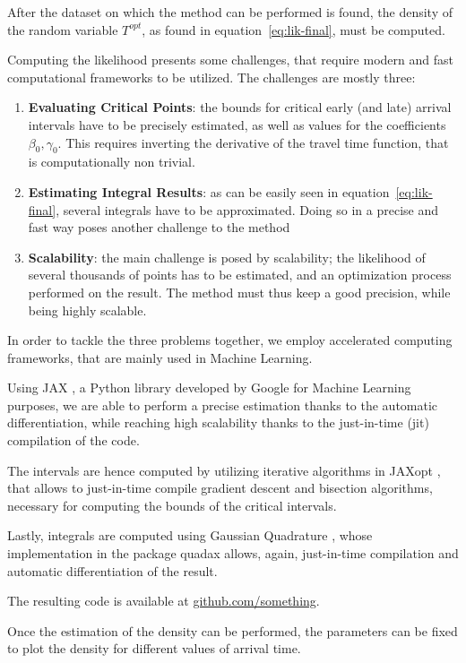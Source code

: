 After the dataset on which the method can be performed is found,
the density of the random variable \(T^{opt}\),
as found in equation~\eqref{eq:lik-final},
must be computed.

Computing the likelihood presents some challenges,
that require modern and fast computational frameworks to be utilized.
The challenges are mostly three:
\begin{enumerate}
\item \textbf{Evaluating Critical Points}:
  the bounds for critical early (and late) arrival intervals have to be precisely estimated,
  as well as values for the coefficients \(\beta_0, \gamma_0\).
  This requires inverting the derivative of the travel time function,
  that is computationally non trivial.
\item \textbf{Estimating Integral Results}:
  as can be easily seen in equation~\eqref{eq:lik-final},
  several integrals have to be approximated.
  Doing so in a precise and fast way poses another challenge to the method
\item \textbf{Scalability}:
  the main challenge is posed by scalability;
  the likelihood of several thousands of points has to be estimated,
  and an optimization process performed on the result.
  The method must thus keep a good precision,
  while being highly scalable.
\end{enumerate}

In order to tackle the three problems together,
we employ accelerated computing frameworks, that are mainly used in Machine Learning.

Using JAX \citep{jax}, a Python library developed by Google for Machine Learning purposes,
we are able to perform a precise estimation thanks to the automatic differentiation,
while reaching high scalability thanks to the just-in-time (jit) compilation of the code.

The intervals are hence computed by utilizing iterative algorithms in JAXopt \citep{jaxopt},
that allows to just-in-time compile gradient descent and bisection algorithms,
necessary for computing the bounds of the critical intervals.

Lastly, integrals are computed using Gaussian Quadrature \citep{gauss_quad},
whose implementation in the package quadax allows, again,
just-in-time compilation and automatic differentiation of the result.

The resulting code is available at \url{github.com/something}.

Once the estimation of the density can be performed,
the parameters can be fixed to plot the density for different values of arrival time.

